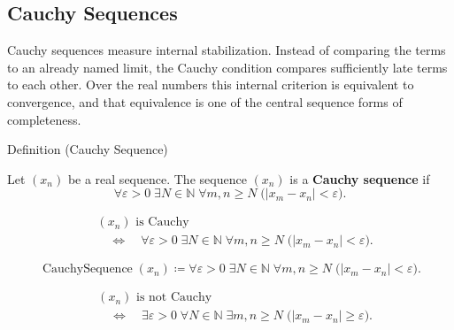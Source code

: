 \subsection*{Cauchy Sequences}

\begin{exposition}
Cauchy sequences measure internal stabilization. Instead of comparing the
terms to an already named limit, the Cauchy condition compares sufficiently
late terms to each other. Over the real numbers this internal criterion is
equivalent to convergence, and that equivalence is one of the central
sequence forms of completeness.
\end{exposition}


\begin{definitionbox}{Definition (Cauchy Sequence)}
\begin{definition}
\label{def:cauchy-sequence}
Let $(x_n)$ be a real sequence. The sequence $(x_n)$ is a
\textbf{Cauchy sequence} if
\[
  \forall \varepsilon>0 \;\exists N\in\mathbb{N}\;\forall m,n\ge N
  \;\bigl(|x_m-x_n|<\varepsilon\bigr).
\]
\end{definition}
\end{definitionbox}

\begin{remark*}
\[
\begin{aligned}
&(x_n)\text{ is Cauchy}\\
&\quad\Longleftrightarrow\quad
\forall \varepsilon>0 \;\exists N\in\mathbb{N}\;\forall m,n\ge N
\;\bigl(|x_m-x_n|<\varepsilon\bigr).
\end{aligned}
\]
\end{remark*}

\begin{remark*}
\[
\operatorname{CauchySequence}(x_n)
\coloneqq
\forall \varepsilon>0 \;\exists N\in\mathbb{N}\;\forall m,n\ge N
\;\bigl(|x_m-x_n|<\varepsilon\bigr).
\]
\end{remark*}

\begin{remark*}
\[
\begin{aligned}
&(x_n)\text{ is not Cauchy}\\
&\quad\Longleftrightarrow\quad
\exists \varepsilon>0 \;\forall N\in\mathbb{N}\;\exists m,n\ge N
\;\bigl(|x_m-x_n|\ge\varepsilon\bigr).
\end{aligned}
\]
\end{remark*}

